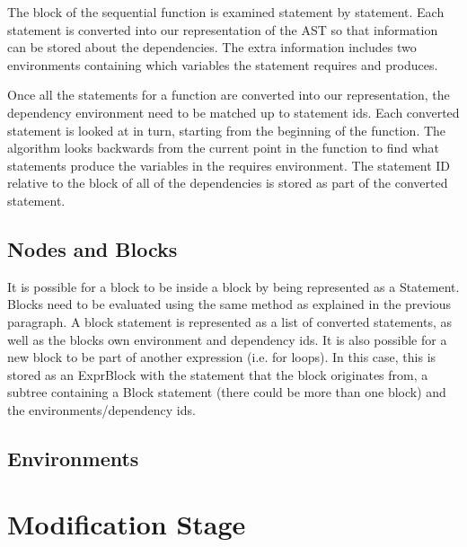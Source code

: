 
The block of the sequential function is examined statement by statement. Each statement is converted into our representation of the AST so that information can be stored about the dependencies. The extra information includes two environments containing which variables the statement requires and produces.

Once all the statements for a function are converted into our representation, the dependency environment need to be matched up to statement ids. Each converted statement is looked at in turn, starting from the beginning of the function. The algorithm looks backwards from the current point in the function to find what statements produce the variables in the requires environment. The statement ID relative to the block of all of the dependencies is stored as part of the converted statement.


\subsection{Nodes and Blocks}
It is possible for a block to be inside a block by being represented as a Statement. Blocks need to be evaluated using the same method as explained in the previous paragraph. A block statement is represented as a list of converted statements, as well as the blocks own environment and dependency ids. It is also possible for a new block to be part of another expression (i.e. for loops). In this case, this is stored as an ExprBlock with the statement that the block originates from, a subtree containing a Block statement (there could be more than one block) and the environments/dependency ids.


\subsection{Environments}


\section{Modification Stage}
